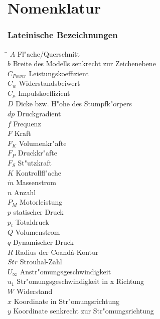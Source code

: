 \chapter*{Nomenklatur}

\subsection*{Lateinische Bezeichnungen}
\begin{tabbing}
\hspace*{2cm}\=\kill
$A$ \> Fl"ache/Querschnitt \\[0.2ex]
$b$ \> Breite des Modells senkrecht zur Zeichenebene \\[0.2ex]
$C_{Power}$ \> Leistungskoeffizient \\[0.2ex]
$C_w$ \> Widerstandsbeiwert \\[0.2ex]
$C_{\mu}$ \> Impulskoeffizient \\[0.2ex]
$D$ \> Dicke bzw. H"ohe des Stumpfk"orpers \\[0.2ex]
$dp$ \> Druckgradient \\[0.2ex]
$f$ \> Frequenz \\[0.2ex]
$F$ \> Kraft \\[0.2ex]
$F_{K}$ \> Volumenkr"afte \\[0.2ex]
$F_{P}$ \> Druckkr"afte \\[0.2ex]
$F_{S}$ \> St"utzkraft \\[0.2ex]
$K$ \> Kontrollfl"ache \\[0.2ex]
$\dot{m}$ \> Massenstrom \\[0.2ex]
$n$ \> Anzahl \\[0.2ex]
$P_M$ \> Motorleistung \\[0.2ex]
$p$ \> statischer Druck \\[0.2ex]
$p_t$ \> Totaldruck \\[0.2ex]
$Q$ \> Volumenstrom \\[0.2ex]
$q$ \> Dynamischer Druck \\[0.2ex]
$R$ \> Radius der Coand\^{a}-Kontur \\[0.2ex]
$Str$ \> Strouhal-Zahl \\[0.2ex]
$U_{\infty}$ \> Anstr"omungsgeschwindigkeit \\[0.2ex]
$u_1$ \> Str"omungsgeschwindigkeit in x Richtung \\[0.2ex]
$W$ \> Widerstand \\[0.2ex]
$x$ \> Koordinate in Str"omungsrichtung \\[0.2ex]
$y$ \> Koordinate senkrecht zur Str"omungsrichtung \\[0.2ex]
\end{tabbing}



